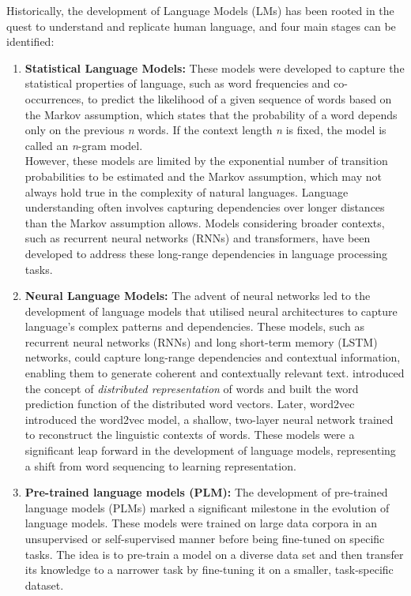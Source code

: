 Historically, the development of Language Models (LMs) has been rooted in the quest to understand and replicate human language, and four main stages can be identified:
\begin{enumerate}
	\item \textbf{Statistical Language Models:} {These models were developed to capture the statistical properties of language, such as word frequencies and co-occurrences, to predict the likelihood of a given sequence of words based on the Markov assumption, which states that the probability of a word depends only on the previous \textit{n} words.
		      If the context length \textit{n} is fixed, the model is called an \textit{n}-gram model.\\
		      However, these models are limited by the exponential number of transition probabilities to be estimated and the Markov assumption, which may not always hold true in the complexity of natural languages.
		      Language understanding often involves capturing dependencies over longer distances than the Markov assumption allows. Models considering broader contexts, such as recurrent neural networks (RNNs) and transformers, have been developed to address these long-range dependencies in language processing tasks.}
	\item \textbf{Neural Language Models:} {The advent of neural networks led to the development of language models that utilised neural architectures to capture language's complex patterns and dependencies.
		      These models, such as recurrent neural networks (RNNs) and long short-term memory (LSTM) networks, could capture long-range dependencies and contextual information, enabling them to generate coherent and contextually relevant text.
		      \textcite{bengio2003neural} introduced the concept of \textit{distributed representation} of words and built the word prediction function of the distributed word vectors.
		      Later, word2vec~\cite{mikolov2013distributed, mikolov2013efficient} introduced the word2vec model, a shallow, two-layer neural network trained to reconstruct the linguistic contexts of words.
		      These models were a significant leap forward in the development of language models, representing a shift from word sequencing to learning representation.}
	\item \textbf{Pre-trained language models (PLM):} {The development of pre-trained language models (PLMs) marked a significant milestone in the evolution of language models.
		      These models were trained on large data corpora in an unsupervised or self-supervised manner before being fine-tuned on specific tasks. The idea is to pre-train a model on a diverse data set and then transfer its knowledge to a narrower task by fine-tuning it on a smaller, task-specific dataset.
}
\end{enumerate}
